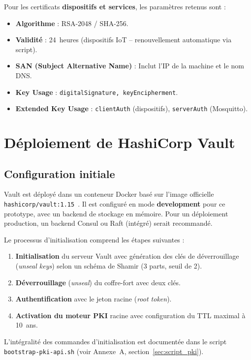 Pour les certificats \textbf{dispositifs et services}, les paramètres retenus sont :
\begin{itemize}
  \item \textbf{Algorithme} : RSA-2048 / SHA-256.
  \item \textbf{Validité} : 24~heures (dispositifs IoT -- renouvellement automatique via script).
  \item \textbf{SAN (Subject Alternative Name)} : Inclut l'IP de la machine et le nom DNS.
  \item \textbf{Key Usage} : \texttt{digitalSignature, keyEncipherment}.
  \item \textbf{Extended Key Usage} : \texttt{clientAuth} (dispositifs), \texttt{serverAuth} (Mosquitto).
\end{itemize}

\section{Déploiement de HashiCorp Vault}

\subsection{Configuration initiale}

Vault est déployé dans un conteneur Docker basé sur l'image officielle \texttt{hashicorp/vault:1.15}~\cite{vault_pki}. Il est configuré en mode \textbf{development} pour ce prototype, avec un backend de stockage en mémoire. Pour un déploiement production, un backend Consul ou Raft (intégré) serait recommandé.

Le processus d'initialisation comprend les étapes suivantes :
\begin{enumerate}
  \item \textbf{Initialisation} du serveur Vault avec génération des clés de déverrouillage (\textit{unseal keys}) selon un schéma de Shamir (3 parts, seuil de 2).
  \item \textbf{Déverrouillage} (\textit{unseal}) du coffre-fort avec deux clés.
  \item \textbf{Authentification} avec le jeton racine (\textit{root token}).
  \item \textbf{Activation du moteur PKI} racine avec configuration du TTL maximal à 10~ans.
\end{enumerate}

L'intégralité des commandes d'initialisation est documentée dans le script \texttt{bootstrap-pki-api.sh} (voir Annexe~A, section~\ref{sec:script_pki}).

